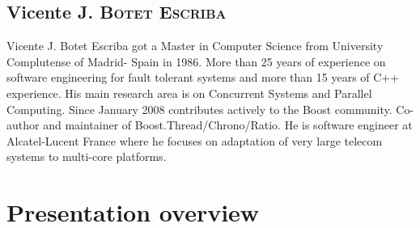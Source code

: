 \documentclass[a4paper,10pt]{article}
\begin{document}
\subsection{Vicente J. B\textsc{otet} E\textsc{scriba}}

Vicente J. Botet Escriba got a Master in Computer Science from University Complutense of Madrid- Spain in 1986. More than 25 years of experience on software engineering for fault tolerant systems and more than 15 years of C++ experience. His main research area is on Concurrent Systems and Parallel Computing. Since January 2008 contributes actively to the Boost community. Co-author and maintainer of Boost.Thread/Chrono/Ratio. He is software engineer at Alcatel-Lucent France where he focuses on adaptation of very large telecom systems to multi-core platforms.

\section{Presentation overview}
\end{document}

